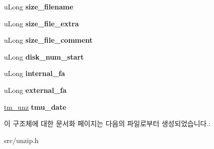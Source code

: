 \begin{DoxyCompactItemize}
u\+Long {\bfseries size\+\_\+filename}
\item 
\mbox{\label{structunz__file__info__s_a479402dcb3555c922e3ce87c8f967990}} 
u\+Long {\bfseries size\+\_\+file\+\_\+extra}
\item 
\mbox{\label{structunz__file__info__s_afa9feffb3b9c9c03e02599118d5f548e}} 
u\+Long {\bfseries size\+\_\+file\+\_\+comment}
\item 
\mbox{\label{structunz__file__info__s_ab7bfba2b7d0cdb7260a7cd9f9ccd00ff}} 
u\+Long {\bfseries disk\+\_\+num\+\_\+start}
\item 
\mbox{\label{structunz__file__info__s_aa20738bf82bca71cc950b9475b5d8c3c}} 
u\+Long {\bfseries internal\+\_\+fa}
\item 
\mbox{\label{structunz__file__info__s_ae3365fdb260668fca60bfb975b1513aa}} 
u\+Long {\bfseries external\+\_\+fa}
\item 
\mbox{\label{structunz__file__info__s_ad52c08c65349f674b00244d81cdb1736}} 
\mbox{\hyperlink{structtm__unz__s}{tm\+\_\+unz}} {\bfseries tmu\+\_\+date}
\end{DoxyCompactItemize}


이 구조체에 대한 문서화 페이지는 다음의 파일로부터 생성되었습니다.\+:\begin{DoxyCompactItemize}
\item 
src/unzip.\+h\end{DoxyCompactItemize}
